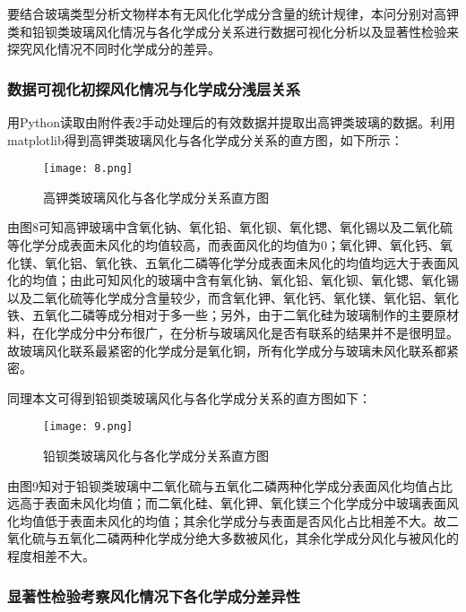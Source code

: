 要结合玻璃类型分析文物样本有无风化化学成分含量的统计规律，本问分别对高钾类和铅钡类玻璃风化情况与各化学成分关系进行数据可视化分析以及显著性检验来探究风化情况不同时化学成分的差异。

\subsubsection{数据可视化初探风化情况与化学成分浅层关系}

用Python读取由附件表2手动处理后的有效数据并提取出高钾类玻璃的数据。利用matplotlib得到高钾类玻璃风化与各化学成分关系的直方图，如下所示：

\begin{figure}[H] 
	\centering %
	\texttt{[image: 8.png]} %
	\caption{高钾类玻璃风化与各化学成分关系直方图} %
	\label{Fig.main9} %
\end{figure}


由图8可知高钾玻璃中含氧化钠、氧化铅、氧化钡、氧化锶、氧化锡以及二氧化硫等化学分成表面未风化的均值较高，而表面风化的均值为0；氧化钾、氧化钙、氧化镁、氧化铝、氧化铁、五氧化二磷等化学分成表面未风化的均值均远大于表面风化的均值；由此可知风化的玻璃中含有氧化钠、氧化铅、氧化钡、氧化锶、氧化锡以及二氧化硫等化学成分含量较少，而含氧化钾、氧化钙、氧化镁、氧化铝、氧化铁、五氧化二磷等成分相对于多一些；另外，由于二氧化硅为玻璃制作的主要原材料，在化学成分中分布很广，在分析与玻璃风化是否有联系的结果并不是很明显。故玻璃风化联系最紧密的化学成分是氧化铜，所有化学成分与玻璃未风化联系都紧密。

同理本文可得到铅钡类玻璃风化与各化学成分关系的直方图如下：


\begin{figure}[H] 
	\centering %
	\texttt{[image: 9.png]} %
	\caption{铅钡类玻璃风化与各化学成分关系直方图} %
	\label{Fig.main10} %
\end{figure}

由图9知对于铅钡类玻璃中二氧化硫与五氧化二磷两种化学成分表面风化均值占比远高于表面未风化均值；而二氧化硅、氧化钾、氧化镁三个化学成分中玻璃表面风化均值低于表面未风化的均值；其余化学成分与表面是否风化占比相差不大。故二氧化硫与五氧化二磷两种化学成分绝大多数被风化，其余化学成分风化与被风化的程度相差不大。

\subsubsection{显著性检验考察风化情况下各化学成分差异性}

